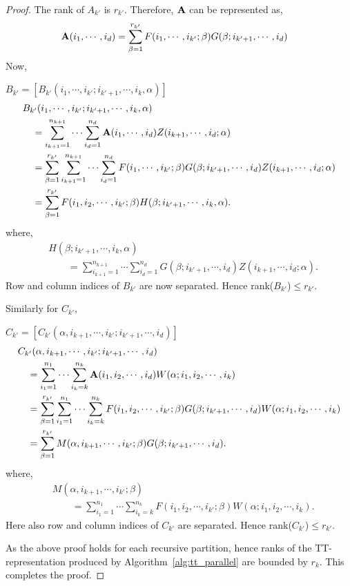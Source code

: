 \documentclass[runningheads]{llncs}
\newcommand{\tensor}[1]{{\cal\textbf{#1}\xspace}}
\begin{document}
\begin{proof}
	\noindent The rank of $A_{k'}$ is $r_{k'}$. Therefore, $\tensor{A}$ can be represented as,
	\begin{align*}
	\tensor{A}(i_1, \cdots, i_d) &= \sum_{\beta=1}^{r_{k'}} F(i_1,\cdots ,i_{k'}; \beta) G(\beta; i_{k'+1},\cdots, i_d)
	\end{align*}
	\noindent Now,
	
	\noindent $B_{k'} = [B_{k'}(i_1, \cdots, i_{k'}; i_{k'+1},\cdots,i_k, \alpha)]$
	\begin{align*}
	&B_{k'}(i_1, \cdots, i_{k'}; i_{k'+1},\cdots,i_k, \alpha)\\
	&\quad= \sum_{i_{k+1}=1}^{n_{k+1}}\cdots\sum_{i_d=1}^{n_d} \tensor{A}(i_1, \cdots, i_d)Z(i_{k+1},\cdots, i_d;\alpha)\\
	&\quad= \sum_{\beta=1}^{r_{k'}} \sum_{i_{k+1}=1}^{n_{k+1}}\cdots\sum_{i_d=1}^{n_d} F(i_1,\cdots ,i_{k'}; \beta) G(\beta; i_{k'+1},\cdots, i_d) Z(i_{k+1}, \cdots, i_d;\alpha)\\
	&\quad= \sum_{\beta=1}^{r_{k'}} F(i_1,i_2,\cdots ,i_{k'}; \beta) H(\beta; i_{k'+1},\cdots, i_k, \alpha).
	\end{align*}
	\noindent where,
	\begin{align*}
	&H(\beta;i_{k'+1},\cdots, i_k, \alpha)\\ 
	&\qquad= \sum_{i_{k+1}=1}^{n_{k+1}}\cdots\sum_{i_d=1}^{n_d} G(\beta; i_{k'+1},\cdots, i_d) Z(i_{k+1},\cdots, i_d;\alpha).
	\end{align*}
	\noindent Row and column indices of $B_{k'}$ are now separated. Hence rank($B_{k'}$)$ \le r_{k'}$.
	
	\medskip
	\noindent Similarly for $C_{k'}$,
	
	\noindent $C_{k'}= [C_{k'}(\alpha, i_{k+1}, \cdots, i_{k'}; i_{k'+1},\cdots, i_d)]$
	\begin{align*}
	&C_{k'}(\alpha, i_{k+1}, \cdots, i_{k'}; i_{k'+1},\cdots, i_d)\\
	&\quad= \sum_{i_1=1}^{n_1} \cdots \sum_{i_k=k}^{n_k} \tensor{A}(i_1, i_2, \cdots, i_d) W(\alpha; i_1,i_2,\cdots, i_k)\\
	&\quad= \sum_{\beta=1}^{r_{k'}} \sum_{i_1=1}^{n_1} \cdots \sum_{i_k=k}^{n_k} F(i_1,i_2,\cdots ,i_{k'}; \beta) G(\beta; i_{k'+1},\cdots, i_d) W(\alpha; i_1,i_2,\cdots, i_k)\\ 
	&\quad= \sum_{\beta=1}^{r_{k'}} M(\alpha, i_{k+1}, \cdots, i_{k'}; \beta) G(\beta; i_{k'+1},\cdots, i_d).
	\end{align*}	
	\noindent where,
	\begin{align*}
	&M(\alpha, i_{k+1}, \cdots, i_{k'}; \beta)\\ 
	&\qquad= \sum_{i_1=1}^{n_1} \cdots \sum_{i_k=k}^{n_k} F(i_1,i_2,\cdots ,i_{k'}; \beta) W(\alpha; i_1,i_2,\cdots, i_k).
	\end{align*}
	\noindent Here also row and column indices of $C_{k'}$ are separated. Hence rank($C_{k'}$)$ \le r_{k'}$.
	
	\noindent As the above proof holds for each recursive partition, hence  ranks of the TT-representation produced by Algorithm~\ref{alg:tt_parallel} are bounded by $r_k$. This completes the proof.
\end{proof}
\end{document}
